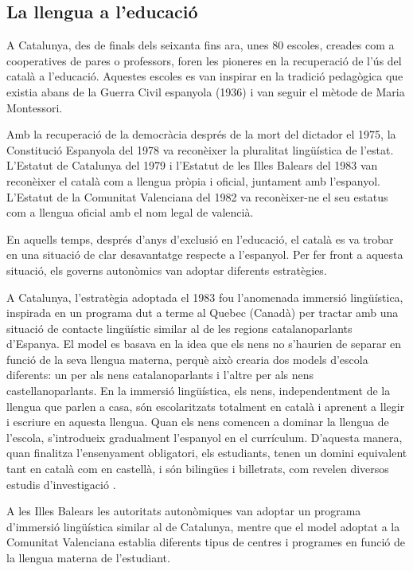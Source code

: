 \documentclass[]{../../metanetpaper}
\begin{document}
\begin{multicols}{2}
\subsection{La llengua a l’educació}

A Catalunya, des de finals dels seixanta fins ara, unes 80 escoles, creades com a cooperatives de pares o professors, foren les pioneres en la recuperació de l’ús del català a l’educació. Aquestes escoles es van inspirar en la tradició pedagògica que existia abans de la Guerra Civil espanyola (1936) i van seguir el mètode de Maria Montessori.

Amb la recuperació de la democràcia després de la mort del dictador el 1975, la Constitució Espanyola del 1978 va reconèixer la pluralitat lingüística de l’estat. L’Estatut de Catalunya del 1979 i l’Estatut de les Illes Balears del 1983 van reconèixer el català com a llengua pròpia i oficial, juntament amb l’espanyol. L’Estatut de la Comunitat Valenciana del 1982 va reconèixer-ne el seu estatus com a llengua oficial amb el nom legal de valencià.

En aquells temps, després d’anys d’ex\-clu\-sió en l’educació, el català es va trobar en una situació de clar desavantatge respecte a l’espanyol. Per fer front a aquesta situació, els governs autonòmics van adoptar diferents estratègies.

A Catalunya, l’estratègia adoptada el 1983 fou l’anomenada immersió lingüística, inspirada en un programa dut a terme al Quebec (Canadà) per tractar amb una situació de contacte lingüístic similar al de les regions catalanoparlants d’Espanya. El model es basava en la idea que els nens no s’haurien de separar en funció de la seva llengua materna, perquè això crearia dos models d’escola diferents: un per als nens catalanoparlants i l’altre per als nens castellanoparlants. En la immersió lingüística, els nens, independentment de la llengua que parlen a casa, són escolaritzats totalment en català i aprenent a llegir i escriure en aquesta llengua. Quan els nens comencen a dominar la llengua de l’escola, s’introdueix gradualment l’espanyol en el currículum. D’aquesta manera, quan finalitza l’ensenyament obligatori, els estudiants, tenen un domini equivalent tant en català com en castellà, i són bilingües i billetrats, com revelen diversos estudis d’investigació \cite{CAT-Nota5}.

A les Illes Balears les autoritats autonòmiques van adoptar un programa d’immersió lingüística similar al de Catalunya, mentre que el model adoptat a la Comunitat Valenciana establia diferents tipus de centres i programes en funció de la llengua materna de l’estudiant.


\end{multicols}
\end{document}
